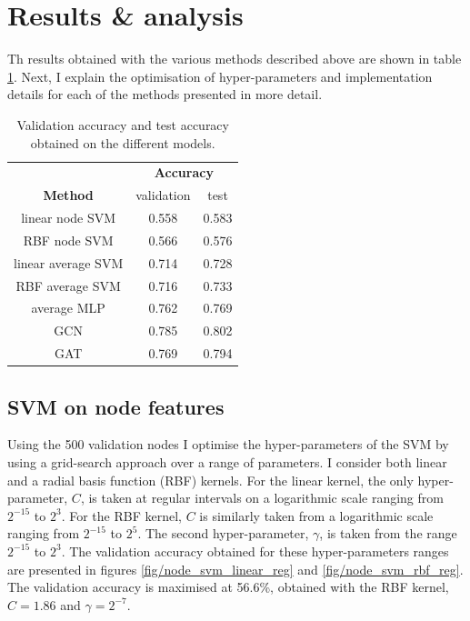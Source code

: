 \documentclass[12pt]{article}
\theoremstyle{definition}
\begin{document}
\section{Results \& analysis}
Th results obtained with the various methods described above are shown in table \ref{table/all_results}. Next, I explain the optimisation of hyper-parameters and implementation details for each of the methods presented in more detail.

\begin{table}[h]
\centering	
{\renewcommand{\arraystretch}{1.4} %
\begin{tabular}{ c| c c }
& \multicolumn{2}{c}{\textbf{Accuracy}} \\
\textbf{Method}  & validation & test \\
linear node SVM & 0.558 & 0.583 \\
RBF node SVM & 0.566 & 0.576 \\
\hline
linear average SVM & 0.714 & 0.728 \\
RBF average SVM & 0.716 & 0.733 \\
\hline
average MLP & 0.762 & 0.769 \\
\hline
GCN & 0.785 & 0.802 \\
\hline
GAT & 0.769 & 0.794 \\
\end{tabular}
}
\caption{Validation accuracy and test accuracy obtained on the different models.}
\label{table/all_results}
\end{table}

\subsection{SVM on node features}
Using the 500 validation nodes I optimise the hyper-parameters of the SVM by using a grid-search approach over a range of parameters. I consider both linear and a radial basis function (RBF) kernels. For the linear kernel, the only hyper-parameter, $C$, is taken at regular intervals on a logarithmic scale ranging from $2^{-15}$ to $2^3$. For the RBF kernel, $C$ is similarly taken from a logarithmic scale ranging from $2^{-15}$ to $2^5$. The second hyper-parameter, $\gamma$, is taken from the range $2^{-15}$ to $2^3$. The validation accuracy obtained for these hyper-parameters ranges are presented in figures \ref{fig/node_svm_linear_reg} and \ref{fig/node_svm_rbf_reg}. The validation accuracy is maximised at 56.6\%, obtained with the RBF kernel, $C=1.86$ and $\gamma=2^{-7}$. 
\end{document}
